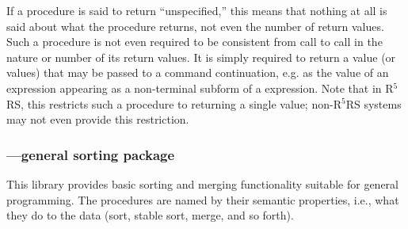 If a procedure is said to return ``unspecified,'' this means that
nothing at all is said about what the procedure returns, not even the
number of return values. Such a procedure is not even required to be
consistent from call to call in the nature or number of its return
values. It is simply required to return a value (or values) that may
be passed to a command continuation, e.g.  as the value of an
expression appearing as a non-terminal subform of a 
expression. Note that in R$^5$RS, this restricts such a procedure to
returning a single value; non-R$^5$RS systems may not even provide this
restriction.

\subsubsection{---general sorting package}

This library provides basic sorting and merging functionality suitable for
general programming. The procedures are named by their semantic properties,
i.e., what they do to the data (sort, stable sort, merge, and so forth).

\begin{protos}
\end{protos}

